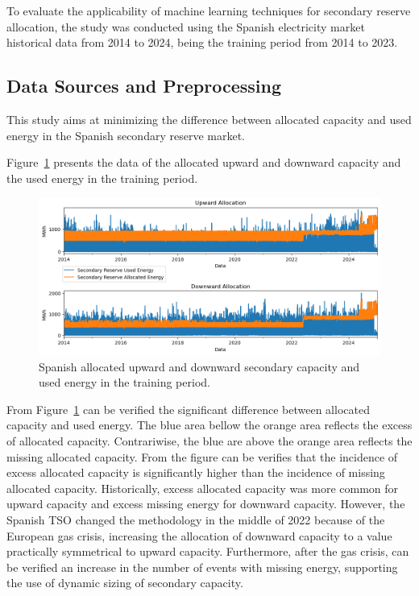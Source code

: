 To evaluate the applicability of machine learning techniques for secondary reserve allocation, the study was conducted using the Spanish electricity market historical data from 2014 to 2024, being the training period from 2014 to 2023.

\subsection{Data Sources and Preprocessing}

\textcolor[rgb]{0.43, 0.21, 0.1}{
This study aims at minimizing the difference between allocated capacity and used energy in the Spanish secondary reserve market}.\par
\textcolor[rgb]{0.43, 0.21, 0.1}{Figure~\ref{fig:training_data} presents the data of the allocated upward and downward capacity and the used energy in the training period.}

\begin{figure}[H]
    \centering
    \includegraphics[width=\textwidth]{plots/allocations_dataset.png}
    \caption{Spanish allocated upward and downward secondary capacity and used energy in the training period.}
    \label{fig:training_data}
  \end{figure}
	
	\textcolor[rgb]{0.43, 0.21, 0.1}{
	From Figure~\ref{fig:training_data} can be verified the significant difference between allocated capacity and used energy.
	The blue area bellow the orange area reflects the excess of allocated capacity. Contrariwise, the blue are above the orange area reflects the missing allocated capacity.
	From the figure can be verifies that the incidence of excess allocated capacity is significantly higher than the incidence of missing allocated capacity.
	Historically, excess allocated capacity was more common for upward capacity and excess missing energy for downward capacity.
	However, the Spanish TSO changed the methodology in the middle of 2022 because of the European gas crisis, increasing the allocation of downward capacity to a value practically symmetrical to upward capacity.
	Furthermore, after the gas crisis, can be verified an increase in the number of events with missing energy, supporting the use of dynamic sizing of secondary capacity.}

